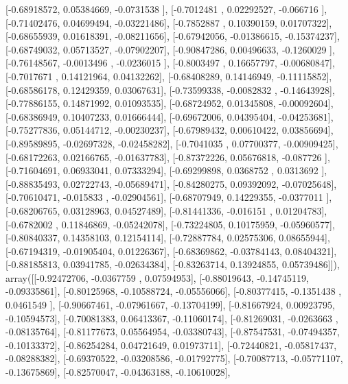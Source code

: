 \documentclass{article}
\begin{document}
       [-0.68918572,  0.05384669, -0.0731538 ],
       [-0.7012481 ,  0.02292527, -0.066716  ],
       [-0.71402476,  0.04699494, -0.03221486],
       [-0.7852887 ,  0.10390159,  0.01707322],
       [-0.68655939,  0.01618391, -0.08211656],
       [-0.67942056, -0.01386615, -0.15374237],
       [-0.68749032,  0.05713527, -0.07902207],
       [-0.90847286,  0.00496633, -0.1260029 ],
       [-0.76148567, -0.0013496 , -0.0236015 ],
       [-0.8003497 ,  0.16657797, -0.00680847],
       [-0.7017671 ,  0.14121964,  0.04132262],
       [-0.68408289,  0.14146949, -0.11115852],
       [-0.68586178,  0.12429359,  0.03067631],
       [-0.73599338, -0.0082832 , -0.14643928],
       [-0.77886155,  0.14871992,  0.01093535],
       [-0.68724952,  0.01345808, -0.00092604],
       [-0.68386949,  0.10407233,  0.01666444],
       [-0.69672006,  0.04395404, -0.04253681],
       [-0.75277836,  0.05144712, -0.00230237],
       [-0.67989432,  0.00610422,  0.03856694],
       [-0.89589895, -0.02697328, -0.02458282],
       [-0.7041035 ,  0.07700377, -0.00909425],
       [-0.68172263,  0.02166765, -0.01637783],
       [-0.87372226,  0.05676818, -0.087726  ],
       [-0.71604691,  0.06933041,  0.07333294],
       [-0.69299898,  0.0368752 ,  0.0313692 ],
       [-0.88835493,  0.02722743, -0.05689471],
       [-0.84280275,  0.09392092, -0.07025648],
       [-0.70610471, -0.015833  , -0.02904561],
       [-0.68707949,  0.14229355, -0.0377011 ],
       [-0.68206765,  0.03128963,  0.04527489],
       [-0.81441336, -0.016151  ,  0.01204783],
       [-0.6782002 ,  0.11846869, -0.05242078],
       [-0.73224805,  0.10175959, -0.05960577],
       [-0.80840337,  0.14358103,  0.12154114],
       [-0.72887784,  0.02575306,  0.08655944],
       [-0.67194319, -0.01905404,  0.01226367],
       [-0.68369862, -0.03784143,  0.08404321],
       [-0.88185813,  0.03941785, -0.02634384],
       [-0.83263714,  0.13924855,  0.05739486]]), array([[-0.92472706, -0.0367759 ,  0.07594953],
       [-0.88019643, -0.14745119, -0.09335861],
       [-0.80125968, -0.10588724, -0.05556066],
       [-0.80377415, -0.1351438 ,  0.0461549 ],
       [-0.90667461, -0.07961667, -0.13704199],
       [-0.81667924,  0.00923795, -0.10594573],
       [-0.70081383,  0.06413367, -0.11060174],
       [-0.81269031, -0.0263663 , -0.08135764],
       [-0.81177673,  0.05564954, -0.03380743],
       [-0.87547531, -0.07494357, -0.10133372],
       [-0.86254284,  0.04721649,  0.01973711],
       [-0.72440821, -0.05817437, -0.08288382],
       [-0.69370522, -0.03208586, -0.01792775],
       [-0.70087713, -0.05771107, -0.13675869],
       [-0.82570047, -0.04363188, -0.10610028],
\end{document}
